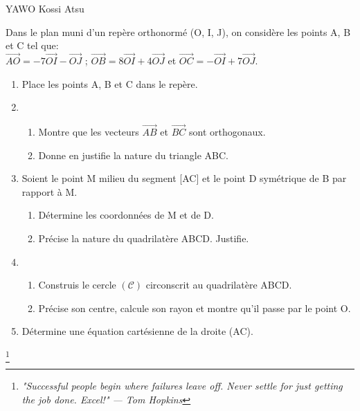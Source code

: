 \documentclass[12pt,a4paper]{book}
\newcommand{\prof}{YAWO Kossi Atsu}
\begin{document}
\begin{revision}{\prof}
\begin{exo}
Dans le plan muni d'un repère orthonormé (O, I, J), on considère les points A, B et C tel que:\\
$\overrightarrow{AO}=-7\overrightarrow{OI}-\overrightarrow{OJ}$ \quad ; \quad $\overrightarrow{OB}=8\overrightarrow{OI}+4\overrightarrow{OJ}$ \quad et \quad $\overrightarrow{OC}=-\overrightarrow{OI}+7\overrightarrow{OJ}$.
\begin{enumerate}
\item Place les points A, B et C dans le repère.
\item \begin{enumerate}
\item Montre que les vecteurs $\overrightarrow{AB}$ et $\overrightarrow{BC}$ sont orthogonaux.
\item Donne en justifie la nature du triangle ABC.
\end{enumerate}
\item Soient le point M milieu du segment [AC] et le point D symétrique de B par rapport à M.
\begin{enumerate}
\item Détermine les coordonnées de M et de D.
\item Précise la nature du quadrilatère ABCD. Justifie.
\end{enumerate} 
\item \begin{enumerate}
\item Construis le cercle $\mathcal{(C)}$ circonscrit au quadrilatère ABCD.
\item Précise son centre, calcule son rayon et montre qu'il passe par le point O.
\end{enumerate}
\item Détermine une équation cartésienne de la droite (AC).
\end{enumerate}
\end{exo}
\footnote{\textit{"Successful people begin where failures leave off. Never settle for just getting the job done. Excel!" — Tom Hopkins}}
\end{revision}
\end{document}
